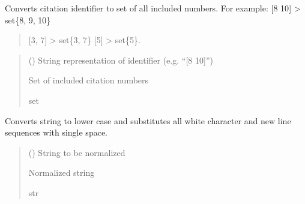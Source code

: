 \documentclass[letterpaper,10pt,english]{sphinxmanual}
\begin{document}

\begin{fulllineitems}
\label{\detokenize{reference_analysis:reference_analysis.identifier_to_number_set}}
\pysigstartsignatures
\pysiglinewithargsret
{}
{}
{}
\pysigstopsignatures
\sphinxAtStartPar
Converts citation identifier to set of all included numbers.
For example: {[}8 \sphinxhyphen{} 10{]} \sphinxhyphen{}\textgreater{} set\{8, 9, 10\}
\begin{quote}

\sphinxAtStartPar
{[}3, 7{]} \sphinxhyphen{}\textgreater{} set\{3, 7\}
{[}5{]} \sphinxhyphen{}\textgreater{} set\{5\}.
\end{quote}
\begin{quote}\begin{description}
\sphinxAtStartPar
{} () \textendash{} String representation of identifier (e.g. “{[}8 \sphinxhyphen{} 10{]}”)

\sphinxAtStartPar
Set of included citation numbers

\sphinxAtStartPar
set

\end{description}\end{quote}

\end{fulllineitems}


\begin{fulllineitems}
\label{\detokenize{reference_analysis:reference_analysis.normalize_text}}
\pysigstartsignatures
\pysiglinewithargsret
{}
{}
{}
\pysigstopsignatures
\sphinxAtStartPar
Converts string to lower case and substitutes all white character and new line sequences with single space.
\begin{quote}\begin{description}
\sphinxAtStartPar
{} () \textendash{} String to be normalized

\sphinxAtStartPar
Normalized string

\sphinxAtStartPar
str

\end{description}\end{quote}

\end{fulllineitems}
\end{document}
